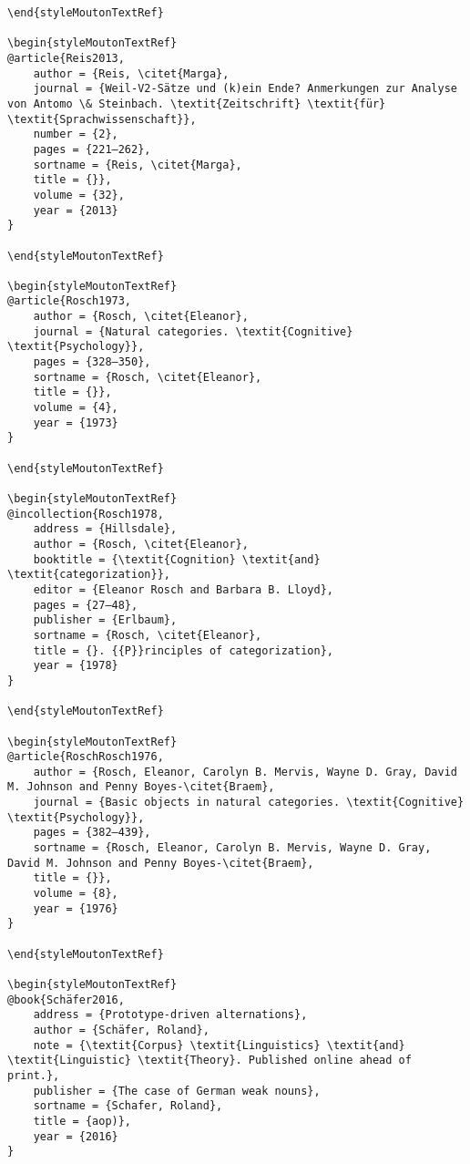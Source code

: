 \begin{styleMoutonHeadingRef}
\begin{verbatim}
\end{styleMoutonTextRef}

\begin{styleMoutonTextRef}
@article{Reis2013,
	author = {Reis, \citet{Marga},
	journal = {Weil-V2-Sätze und (k)ein Ende? Anmerkungen zur Analyse von Antomo \& Steinbach. \textit{Zeitschrift} \textit{für} \textit{Sprachwissenschaft}},
	number = {2},
	pages = {221–262},
	sortname = {Reis, \citet{Marga},
	title = {}},
	volume = {32},
	year = {2013}
}

\end{styleMoutonTextRef}

\begin{styleMoutonTextRef}
@article{Rosch1973,
	author = {Rosch, \citet{Eleanor},
	journal = {Natural categories. \textit{Cognitive} \textit{Psychology}},
	pages = {328–350},
	sortname = {Rosch, \citet{Eleanor},
	title = {}},
	volume = {4},
	year = {1973}
}

\end{styleMoutonTextRef}

\begin{styleMoutonTextRef}
@incollection{Rosch1978,
	address = {Hillsdale},
	author = {Rosch, \citet{Eleanor},
	booktitle = {\textit{Cognition} \textit{and} \textit{categorization}},
	editor = {Eleanor Rosch and Barbara B. Lloyd},
	pages = {27–48},
	publisher = {Erlbaum},
	sortname = {Rosch, \citet{Eleanor},
	title = {}. {{P}}rinciples of categorization},
	year = {1978}
}

\end{styleMoutonTextRef}

\begin{styleMoutonTextRef}
@article{RoschRosch1976,
	author = {Rosch, Eleanor, Carolyn B. Mervis, Wayne D. Gray, David M. Johnson and Penny Boyes-\citet{Braem},
	journal = {Basic objects in natural categories. \textit{Cognitive} \textit{Psychology}},
	pages = {382–439},
	sortname = {Rosch, Eleanor, Carolyn B. Mervis, Wayne D. Gray, David M. Johnson and Penny Boyes-\citet{Braem},
	title = {}},
	volume = {8},
	year = {1976}
}

\end{styleMoutonTextRef}

\begin{styleMoutonTextRef}
@book{Schäfer2016,
	address = {Prototype-driven alternations},
	author = {Schäfer, Roland},
	note = {\textit{Corpus} \textit{Linguistics} \textit{and} \textit{Linguistic} \textit{Theory}. Published online ahead of print.},
	publisher = {The case of German weak nouns},
	sortname = {Schafer, Roland},
	title = {aop)},
	year = {2016}
}


\end{verbatim}
\end{styleMoutonHeadingRef}
